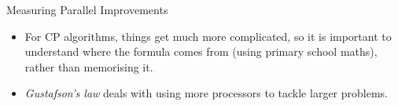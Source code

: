 \documentclass{beamer}
\begin{document}
\begin{frame}{Measuring Parallel Improvements}
{\begin{itemize}
            \item For CP algorithms, things get much more complicated, so it is important to understand
                where the formula comes from (using primary school maths), rather than memorising it.

            \item \emph{Gustafson's law} deals with using more processors to tackle larger problems.
        \end{itemize}
    }

\end{frame}
\end{document}
